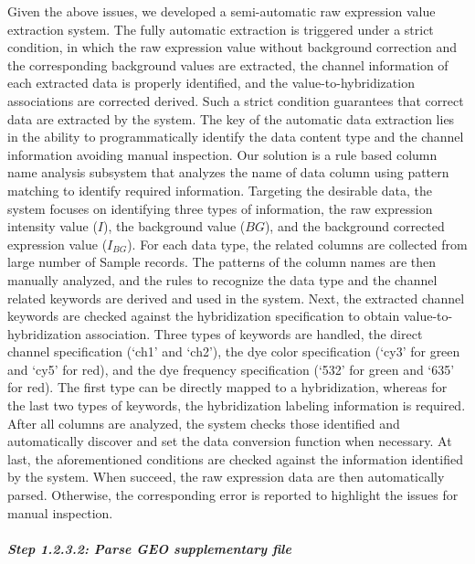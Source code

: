 Given the above issues, we developed a semi-automatic raw expression value extraction system. The fully automatic extraction is triggered under a strict condition, in which the raw expression value without background correction and the corresponding background values are extracted, the channel information of each extracted data is properly identified, and the value-to-hybridization associations are corrected derived. Such a strict condition guarantees that correct data are extracted by the system. The key of the automatic data extraction lies in the ability to programmatically identify the data content type and the channel information avoiding manual inspection. Our solution is a rule based column name analysis subsystem that analyzes the name of data column using pattern matching to identify required information. Targeting the desirable data, the system focuses on identifying three types of information, the raw expression intensity value ($I$), the background value ($BG$), and the background corrected expression value ($I_{BG}$). For each data type, the related columns are collected from large number of Sample records.  The patterns of the column names are then manually analyzed, and the rules to recognize the data type and the channel related keywords are derived and used in the system. Next, the extracted channel keywords are checked against the hybridization specification to obtain value-to-hybridization association. Three types of keywords are handled, the direct channel specification (`ch1' and `ch2'), the dye color specification (`cy3' for green and `cy5' for red), and the dye frequency specification (`532' for green and `635' for red). The first type can be directly mapped to a hybridization, whereas for the last two types of keywords, the hybridization labeling information is required. After all columns are analyzed, the system checks those identified and automatically discover and set the data conversion function when necessary. At last, the aforementioned conditions are checked against the information identified by the system. When succeed, the raw expression data are then automatically parsed. Otherwise, the corresponding error is reported to highlight the issues for manual inspection.      

\subparagraph{\textit{Step 1.2.3.2: Parse GEO supplementary file}}

